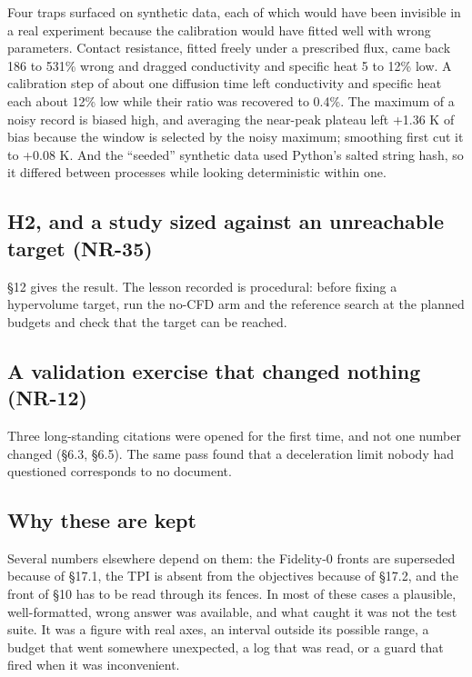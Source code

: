 \documentclass[
  a4paper,
  11pt]{article}
\begin{document}
Four traps surfaced on synthetic data, each of which would have been
invisible in a real experiment because the calibration would have fitted
well with wrong parameters. Contact resistance, fitted freely under a
prescribed flux, came back 186 to 531\% wrong and dragged conductivity
and specific heat 5 to 12\% low. A calibration step of about one
diffusion time left conductivity and specific heat each about 12\% low
while their ratio was recovered to 0.4\%. The maximum of a noisy record
is biased high, and averaging the near-peak plateau left +1.36 K of bias
because the window is selected by the noisy maximum; smoothing first cut
it to +0.08 K. And the ``seeded'' synthetic data used Python's salted
string hash, so it differed between processes while looking
deterministic within one.

\subsection{H2, and a study sized against an unreachable target (NR-35)}

§12 gives the result. The lesson recorded is procedural: before fixing a
hypervolume target, run the no-CFD arm and the reference search at the
planned budgets and check that the target can be reached.

\subsection{A validation exercise that changed nothing (NR-12)}

Three long-standing citations were opened for the first time, and not
one number changed (§6.3, §6.5). The same pass found that a deceleration
limit nobody had questioned corresponds to no document.

\subsection{Why these are kept}

Several numbers elsewhere depend on them: the Fidelity-0 fronts are
superseded because of §17.1, the TPI is absent from the objectives
because of §17.2, and the front of §10 has to be read through its
fences. In most of these cases a plausible, well-formatted, wrong answer
was available, and what caught it was not the test suite. It was a
figure with real axes, an interval outside its possible range, a budget
that went somewhere unexpected, a log that was read, or a guard that
fired when it was inconvenient.
\end{document}
